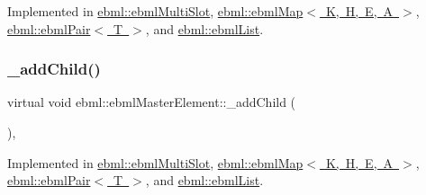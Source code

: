 Implemented in \mbox{\hyperlink{classebml_1_1ebmlMultiSlot_ad5f24ddcacb5a5fcc78a8cc50166d092}{ebml\+::ebml\+Multi\+Slot}}, \mbox{\hyperlink{classebml_1_1ebmlMap_a50fa3572f500363282894b7978b29464}{ebml\+::ebml\+Map$<$ K, H, E, A $>$}}, \mbox{\hyperlink{classebml_1_1ebmlPair_affcffc81a14642fbc375d2fcdbfa29f3}{ebml\+::ebml\+Pair$<$ T $>$}}, and \mbox{\hyperlink{classebml_1_1ebmlList_aafcb7a3112a89b0bdde898b84ee44ec5}{ebml\+::ebml\+List}}.

\mbox{\label{classebml_1_1ebmlMasterElement_a3af0270846a1ced1719d26dd261f0355}} 
\subsubsection{\texorpdfstring{\+\_\+add\+Child()}{\_addChild()}\hspace{0.1cm}{\footnotesize\ttfamily [2/2]}}
{\footnotesize\ttfamily virtual void ebml\+::ebml\+Master\+Element\+::\+\_\+add\+Child (\begin{DoxyParamCaption}\item[{\mbox{\hyperlink{namespaceebml_adad533b7705a16bb360fe56380c5e7be}{ebml\+Element\+\_\+sp}} \&\&}]{ }\end{DoxyParamCaption})\hspace{0.3cm}{\ttfamily [protected]}, {}}



Implemented in \mbox{\hyperlink{classebml_1_1ebmlMultiSlot_aa8d38591ef1932423e2f62d42cc4967c}{ebml\+::ebml\+Multi\+Slot}}, \mbox{\hyperlink{classebml_1_1ebmlMap_ad3e1f23ca6bb1633c1982fb2cbabb39e}{ebml\+::ebml\+Map$<$ K, H, E, A $>$}}, \mbox{\hyperlink{classebml_1_1ebmlPair_a3baa6b65958e830a0fb9e0d80f6497b5}{ebml\+::ebml\+Pair$<$ T $>$}}, and \mbox{\hyperlink{classebml_1_1ebmlList_a372e75614d5c93b7d7a55548c45c2d2f}{ebml\+::ebml\+List}}.

\mbox{\label{classebml_1_1ebmlMasterElement_a16b141ac7d241a9b95c029761fdfc02f}} 
